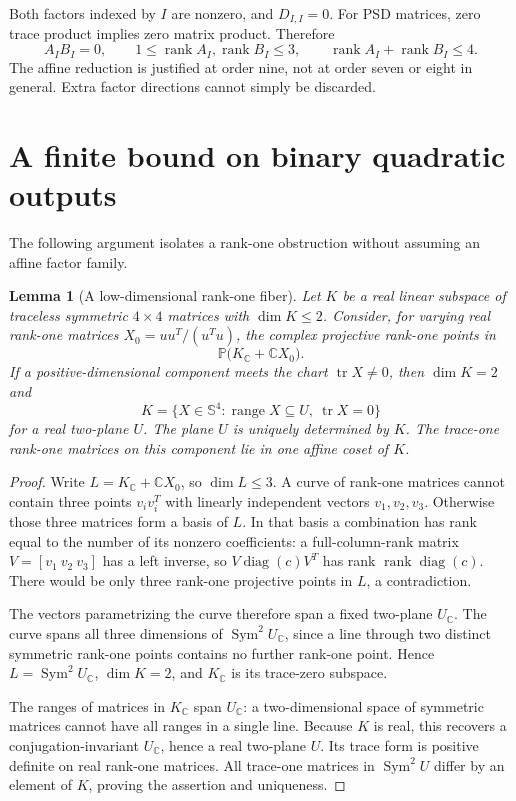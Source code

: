 \documentclass[11pt]{article}
\newtheorem{lemma}[theorem]{Lemma}
\theoremstyle{remark}\newtheorem{remark}[theorem]{Remark}
\newcommand{\Sym}{\mathbb S}
\newcommand{\C}{\mathbb C}
\newcommand{\tr}{\operatorname{tr}}
\newcommand{\rank}{\operatorname{rank}}
\newcommand{\diag}{\operatorname{diag}}
\begin{document}
Both factors indexed by $I$ are nonzero, and $D_{I,I}=0$. For PSD matrices, zero trace product implies zero matrix product. Therefore
\begin{equation}\label{eq:orthogonal}
 A_I B_I=0,\qquad 1\leq\rank A_I,\rank B_I\leq3,
 \qquad \rank A_I+\rank B_I\leq4.
\end{equation}
The affine reduction is justified at order nine, not at order seven or eight in general. Extra factor directions cannot simply be discarded.

\section{A finite bound on binary quadratic outputs}
The following argument isolates a rank-one obstruction without assuming an affine factor family.

\begin{lemma}[A low-dimensional rank-one fiber]\label{lem:fiber}
Let $K$ be a real linear subspace of traceless symmetric $4\times4$ matrices with $\dim K\leq2$. Consider, for varying real rank-one matrices $X_0=uu^T/(u^Tu)$, the complex projective rank-one points in
\[
 \mathbb P\bigl(K_{\C}+\C X_0\bigr).
\]
If a positive-dimensional component meets the chart $\tr X\ne0$, then $\dim K=2$ and
\[
 K=\{X\in\Sym^4:\operatorname{range}X\subseteq U,\ \tr X=0\}
\]
for a real two-plane $U$. The plane $U$ is uniquely determined by $K$. The trace-one rank-one matrices on this component lie in one affine coset of $K$.
\end{lemma}
\begin{proof}
Write $L=K_{\C}+\C X_0$, so $\dim L\leq3$. A curve of rank-one matrices cannot contain three points $v_i v_i^T$ with linearly independent vectors $v_1,v_2,v_3$. Otherwise those three matrices form a basis of $L$. In that basis a combination has rank equal to the number of its nonzero coefficients: a full-column-rank matrix $V=[v_1\ v_2\ v_3]$ has a left inverse, so $V\diag(c)V^T$ has rank $\rank\diag(c)$. There would be only three rank-one projective points in $L$, a contradiction.

The vectors parametrizing the curve therefore span a fixed two-plane $U_{\C}$. The curve spans all three dimensions of $\operatorname{Sym}^2 U_{\C}$, since a line through two distinct symmetric rank-one points contains no further rank-one point. Hence $L=\operatorname{Sym}^2 U_{\C}$, $\dim K=2$, and $K_{\C}$ is its trace-zero subspace.

The ranges of matrices in $K_{\C}$ span $U_{\C}$: a two-dimensional space of symmetric matrices cannot have all ranges in a single line. Because $K$ is real, this recovers a conjugation-invariant $U_{\C}$, hence a real two-plane $U$. Its trace form is positive definite on real rank-one matrices. All trace-one matrices in $\operatorname{Sym}^2 U$ differ by an element of $K$, proving the assertion and uniqueness.
\end{proof}
\end{document}

